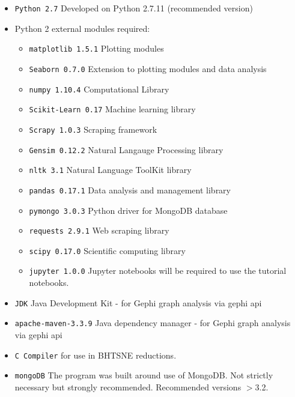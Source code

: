 \begin{itemize}
\itemsep-.6em
\item \texttt{Python 2.7} Developed on Python 2.7.11 (recommended version)
\item Python 2 external modules required:
	\begin{itemize}
	\itemsep-.6em
	\item \texttt{matplotlib 1.5.1} Plotting modules \cite{matplotlib}
	\item \texttt{Seaborn 0.7.0} Extension to plotting modules and data analysis \cite{seaborn}
    \item \texttt{numpy 1.10.4} Computational Library	 \cite{numpy}
	\item \texttt{Scikit-Learn 0.17} Machine learning library \cite{scikitlearn}
	\item \texttt{Scrapy 1.0.3} Scraping framework
	\item \texttt{Gensim 0.12.2} Natural Langauge Processing library \cite{gensim}
	\item \texttt{nltk 3.1} Natural Language ToolKit library \cite{nltk}
	\item \texttt{pandas 0.17.1} Data analysis and management library \cite{pandas}
	\item \texttt{pymongo 3.0.3} Python driver for MongoDB database 
    \item \texttt{requests 2.9.1} Web scraping library 
    \item \texttt{scipy 0.17.0} Scientific computing library \cite{scipy}
	\item \texttt{jupyter 1.0.0} Jupyter notebooks will be required to use the tutorial notebooks.
    \end{itemize}
\item \texttt{JDK} Java Development Kit - for Gephi graph analysis via gephi api
\item \texttt{apache-maven-3.3.9} Java dependency manager - for Gephi graph analysis via gephi api
\item \texttt{C Compiler} for use in BHTSNE reductions\cite{bhtsne}.
\item \texttt{mongoDB} The program was built around use of MongoDB. Not strictly necessary but strongly recommended. Recommended versions $>$3.2.
\end{itemize}  
